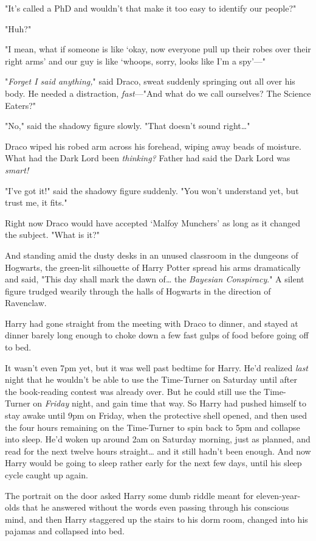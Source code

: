 "It's called a PhD and wouldn't that make it too easy to identify our people?"

"Huh?"

"I mean, what if someone is like `okay, now everyone pull up their robes over
their right arms' and our guy is like `whoops, sorry, looks like I'm a spy'---"

"\emph{Forget I said anything,}" said Draco, sweat suddenly springing out all
over his body. He needed a distraction, \emph{fast}---"And what do we call
ourselves? The Science Eaters?"

"No," said the shadowy figure slowly. "That doesn't sound right{\ldots}"

Draco wiped his robed arm across his forehead, wiping away beads of moisture.
What had the Dark Lord been \emph{thinking?} Father had said the Dark Lord was
\emph{smart!}

"I've got it!" said the shadowy figure suddenly. "You won't understand yet, but
trust me, it fits."

Right now Draco would have accepted `Malfoy Munchers' as long as it changed the
subject. "What is it?"

And standing amid the dusty desks in an unused classroom in the dungeons of
Hogwarts, the green-lit silhouette of Harry Potter spread his arms dramatically
and said, "This day shall mark the dawn of{\ldots} the \emph{Bayesian
Conspiracy}."
\later
A silent figure trudged wearily through the halls of Hogwarts in the direction
of Ravenclaw.

Harry had gone straight from the meeting with Draco to dinner, and stayed at
dinner barely long enough to choke down a few fast gulps of food before going
off to bed.

It wasn't even 7pm yet, but it was well past bedtime for Harry. He'd realized
\emph{last} night that he wouldn't be able to use the Time-Turner on Saturday
until after the book-reading contest was already over. But he could still use
the Time-Turner on \emph{Friday} night, and gain time that way. So Harry had
pushed himself to stay awake until 9pm on Friday, when the protective shell
opened, and then used the four hours remaining on the Time-Turner to spin back
to 5pm and collapse into sleep. He'd woken up around 2am on Saturday morning,
just as planned, and read for the next twelve hours straight{\ldots} and it
still hadn't been enough. And now Harry would be going to sleep rather early
for the next few days, until his sleep cycle caught up again.

The portrait on the door asked Harry some dumb riddle meant for
eleven-year-olds that he answered without the words even passing through his
conscious mind, and then Harry staggered up the stairs to his dorm room,
changed into his pajamas and collapsed into bed.

